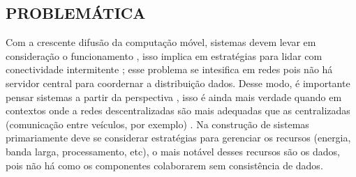 \subsection{PROBLEMÁTICA}

Com a crescente difusão da computação móvel, sistemas devem levar em consideração o funcionamento , isso implica em estratégias para lidar com conectividade intermitente \cite{feyerke2021offlinefirst}; esse problema se intesifica em redes  pois não há servidor central para coordernar a distribuição dados. Desse modo, é importante pensar sistemas a partir da perspectiva , isso é ainda mais verdade quando em contextos onde a redes descentralizadas são mais adequadas que as centralizadas (comunicação entre veículos, por exemplo) \cite{fasihi2025d2d}. Na construção de sistemas primariamente  deve se considerar estratégias para gerenciar os recursos (energia, banda larga, processamento, etc), o mais notável desses recursos são os dados, pois não há como os componentes colaborarem sem consistência de dados.

